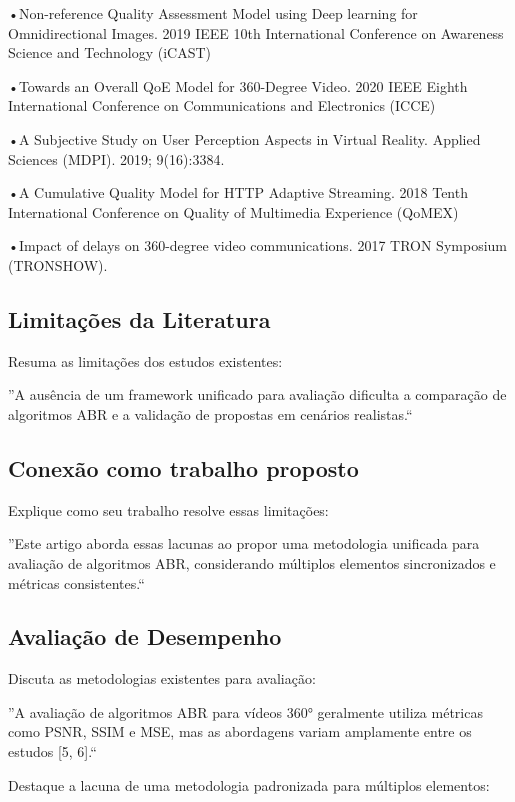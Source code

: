 •Non-reference Quality Assessment Model using Deep learning for Omnidirectional Images.  2019 IEEE 10th International Conference on Awareness Science and Technology (iCAST)

•Towards an Overall QoE Model for 360-Degree Video. 2020 IEEE Eighth International Conference on Communications and Electronics (ICCE)

•A Subjective Study on User Perception Aspects in Virtual Reality. Applied Sciences (MDPI). 2019; 9(16):3384.

•A Cumulative Quality Model for HTTP Adaptive Streaming. 2018 Tenth International Conference on Quality of Multimedia Experience (QoMEX)

•Impact of delays on 360-degree video communications. 2017 TRON Symposium (TRONSHOW).



\subsection{Limitações da Literatura}

Resuma as limitações dos estudos existentes:

''A ausência de um framework unificado para avaliação dificulta a comparação de algoritmos ABR e a validação de propostas em cenários realistas.``


\subsection{Conexão como trabalho proposto}

Explique como seu trabalho resolve essas limitações:

''Este artigo aborda essas lacunas ao propor uma metodologia unificada para avaliação de algoritmos ABR, considerando múltiplos elementos sincronizados e métricas consistentes.``


\subsection{Avaliação de Desempenho}

Discuta as metodologias existentes para avaliação:

''A avaliação de algoritmos ABR para vídeos 360° geralmente utiliza métricas como PSNR, SSIM e MSE, mas as abordagens variam amplamente entre os estudos [5, 6].``

Destaque a lacuna de uma metodologia padronizada para múltiplos elementos:

